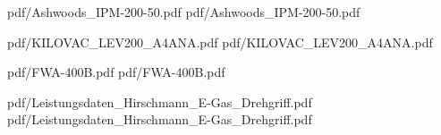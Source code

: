  {pdf/Ashwoods_IPM-200-50.pdf}
 {pdf/Ashwoods_IPM-200-50.pdf}

 {pdf/KILOVAC_LEV200_A4ANA.pdf}
 {pdf/KILOVAC_LEV200_A4ANA.pdf}

 {pdf/FWA-400B.pdf}
 {pdf/FWA-400B.pdf}

 {pdf/Leistungsdaten_Hirschmann_E-Gas_Drehgriff.pdf}
 {pdf/Leistungsdaten_Hirschmann_E-Gas_Drehgriff.pdf}
